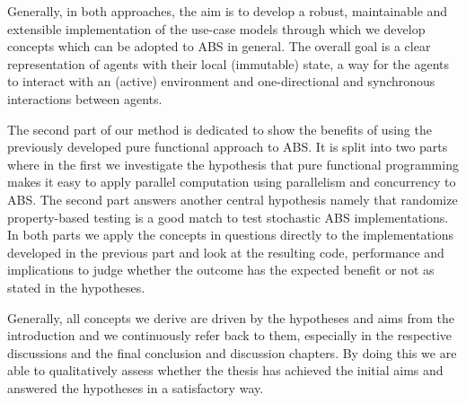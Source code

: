 Generally, in both approaches, the aim is to develop a robust, maintainable and extensible implementation of the use-case models through which we develop concepts which can be adopted to ABS in general. The overall goal is a clear representation of agents with their local (immutable) state, a way for the agents to interact with an (active) environment and one-directional and synchronous interactions between agents. %

The second part of our method is dedicated to show the benefits of using the previously developed pure functional approach to ABS. It is split into two parts where in the first we investigate the hypothesis that pure functional programming makes it easy to apply parallel computation using parallelism and concurrency to ABS. The second part answers another central hypothesis namely that randomize property-based testing is a good match to test stochastic ABS implementations. In both parts we apply the concepts in questions directly to the implementations developed in the previous part and look at the resulting code, performance and implications to judge whether the outcome has the expected benefit or not as stated in the hypotheses.

Generally, all concepts we derive are driven by the hypotheses and aims from the introduction and we continuously refer back to them, especially in the respective discussions and the final conclusion and discussion chapters. By doing this we are able to qualitatively assess whether the thesis has achieved the initial aims and answered the hypotheses in a satisfactory way.